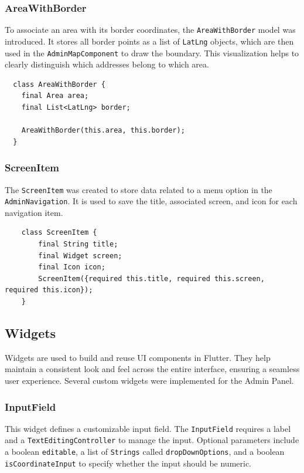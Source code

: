 \subsubsection{AreaWithBorder}
To associate an area with its border coordinates, the \texttt{AreaWithBorder} model was introduced. It stores all border points as a list of \texttt{LatLng} objects, which are then used in the \texttt{AdminMapComponent} to draw the boundary. This visualization helps to clearly distinguish which addresses belong to which area.\\

\lstset{style=mycsharp, caption=AreaWithBorder}
\begin{lstlisting}
  class AreaWithBorder {
    final Area area;
    final List<LatLng> border;
  
    AreaWithBorder(this.area, this.border);
  }
\end{lstlisting}

\subsubsection{ScreenItem}
\label{fig:ScreenItem}
The \texttt{ScreenItem} was created to store data related to a menu option in the \texttt{AdminNavigation}. It is used to save the title, associated screen, and icon for each navigation item.

\lstset{style=mycsharp, caption=ScreenItem}
\begin{lstlisting}
    class ScreenItem {
        final String title;
        final Widget screen;
        final Icon icon;
        ScreenItem({required this.title, required this.screen, required this.icon});
    }
\end{lstlisting}
\subsection{Widgets}
Widgets are used to build and reuse UI components in Flutter. They help maintain a consistent look and feel across the entire interface, ensuring a seamless user experience. Several custom widgets were implemented for the Admin Panel.

\subsubsection{InputField}
\label{fig:InputField} 
This widget defines a customizable input field. The \texttt{InputField} requires a label and a \texttt{TextEditingController} to manage the input. Optional parameters include a boolean \texttt{editable}, a list of \texttt{Strings} called \texttt{dropDownOptions}, and a boolean \texttt{isCoordinateInput} to specify whether the input should be numeric.\\


